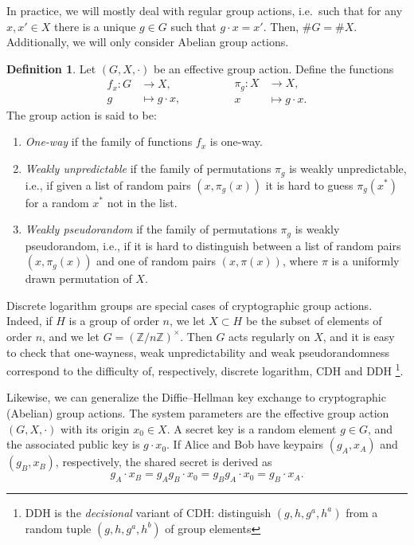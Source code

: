 \documentclass[10pt]{article}
\theoremstyle{plain}
\theoremstyle{definition}
\newtheorem{definition}[theorem]{Definition}
\begin{document}
In practice, we will mostly deal with regular group actions, i.e.\
such that for any $x, x' ∈ X$ there is a unique $g ∈ G$ such that
$g · x = x'$. %
Then, $\#G = \#X$. %
Additionally, we will only consider Abelian group actions.

\begin{definition}
  Let $(G,X,·)$ be an effective group action. %
  Define the functions
  \begin{equation*}
    \begin{aligned}
      f_x : G &\to X,\\
      g &\mapsto g·x,
    \end{aligned}
    \qquad\qquad
    \begin{aligned}
      \pi_g : X &\to X,\\
      x &\mapsto g·x.
    \end{aligned}
  \end{equation*}
  The group action is said to be:
  \begin{enumerate}
  \item \emph{One-way} if the family of functions $f_x$ is one-way.
  \item \emph{Weakly unpredictable} if the family of permutations
    $\pi_g$ is weakly unpredictable, i.e., if given a list of random
    pairs $(x,\pi_g(x))$ it is hard to guess $\pi_g(x^*)$ for a random
    $x^*$ not in the list.
  \item \emph{Weakly pseudorandom} if the family of permutations
    $\pi_g$ is weakly pseudorandom, i.e., if it is hard to distinguish
    between a list of random pairs $(x,\pi_g(x))$ and one of random
    pairs $(x,\pi(x))$, where $\pi$ is a uniformly drawn permutation
    of $X$.
  \end{enumerate}
\end{definition}

Discrete logarithm groups are special cases of cryptographic group
actions. %
Indeed, if $H$ is a group of order $n$, we let $X⊂H$ be the subset of
elements of order $n$, and we let $G = (ℤ/nℤ)^\times$. %
Then $G$ acts regularly on $X$, and it is easy to check that
one-wayness, weak unpredictability and weak pseudorandomness
correspond to the difficulty of, respectively, discrete logarithm, CDH
and DDH%
\footnote{DDH is the \emph{decisional} variant of CDH: distinguish
  $(g,h,g^a,h^a)$ from a random tuple $(g,h,g^a,h^b)$ of group elements}.

Likewise, we can generalize the Diffie--Hellman key exchange to
cryptographic (Abelian) group actions. %
The system parameters are the effective group action $(G,X,·)$ with
its origin $x_0∈X$. %
A secret key is a random element $g∈G$, and the associated public key
is $g·x_0$. %
If Alice and Bob have keypairs $(g_A,x_A)$ and $(g_B,x_B)$,
respectively, the shared secret is derived as
\begin{equation*}
  g_A·x_B = g_Ag_B· x_0 = g_Bg_A·x_0 = g_B·x_A.
\end{equation*}
\end{document}
